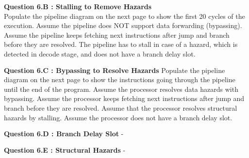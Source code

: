 \documentclass[a4paper,11pt]{article}
\begin{document}
\item \textbf{Question 6.B : Stalling to Remove Hazards} \\

  Populate the pipeline diagram on the next page to show the first 20 cycles of the execution. Assume the pipeline does NOT support data forwarding (bypassing). Assume the pipeline keeps fetching next instructions after jump and branch before they are resolved. The pipeline has to stall in case of a hazard, which is detected in decode stage, and does not have a branch delay slot. \\

\item \textbf{Question 6.C : Bypassing to Resolve Hazards} 
Populate the pipeline diagram on the next page to show the instructions going through the pipeline until the end of the program. Assume the processor resolves data hazards with bypassing. Assume the processor keeps fetching next instructions after jump and branch before they are resolved. Assume that the processor resolves structural hazards by stalling. Assume the processor does not have a branch delay slot. \\

\item \textbf{Question 6.D : Branch Delay Slot} - \\



\item \textbf{Question 6.E : Structural Hazards} - \\
\end{document}
